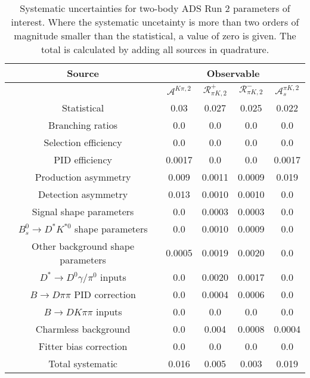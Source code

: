 \begin{sidewaystable}
  \centering
  \begin{tabular}{ccccc}
      \toprule
      Source & \multicolumn{4}{c}{Observable} \\
      \midrule
       & $\mathcal{A}^{K\pi,2}$ & $\mathcal{R}_{\pi K,2}^+$ & $\mathcal{R}_{\pi K,2}^-$ & $\mathcal{A}_s^{\pi K,2}$ \\
      \midrule
      Statistical & 0.03 & 0.027 & 0.025 & 0.022 \\
      \midrule
      Branching ratios & 0.0  & 0.0  & 0.0  & 0.0  \\
      Selection efficiency & 0.0  & 0.0  & 0.0  & 0.0  \\
      PID efficiency & 0.0017 & 0.0  & 0.0  & 0.0017 \\
      Production asymmetry & 0.009 & 0.0011 & 0.0009 & 0.019 \\
      Detection asymmetry & 0.013 & 0.0010 & 0.0010 & 0.0  \\
      Signal shape parameters & 0.0  & 0.0003 & 0.0003 & 0.0  \\
      $B^0_s \to D^* K^{*0}$ shape parameters & 0.0  & 0.0010 & 0.0009 & 0.0  \\
      Other background shape parameters & 0.0005 & 0.0019 & 0.0020 & 0.0  \\
      $D^* \to D^0 \gamma/\pi^0$ inputs & 0.0  & 0.0020 & 0.0017 & 0.0  \\
      $B\to D\pi\pi$ PID correction & 0.0  & 0.0004 & 0.0006 & 0.0  \\
      $B\to DK\pi\pi$ inputs & 0.0  & 0.0  & 0.0  & 0.0  \\
      Charmless background & 0.0  & 0.004 & 0.0008 & 0.0004 \\
      Fitter bias correction & 0.0  & 0.0  & 0.0  & 0.0  \\
      \midrule
      Total systematic & 0.016 & 0.005 & 0.003 & 0.019 \\
      \bottomrule
  \end{tabular}
  \caption{Systematic uncertainties for two-body ADS Run 2 parameters of interest. Where the systematic uncetainty is more than two orders of magnitude smaller than the statistical, a value of zero is given. The total is calculated by adding all sources in quadrature.}
\label{tab:twoBody_ADS_run2_systematics}
\end{sidewaystable}
